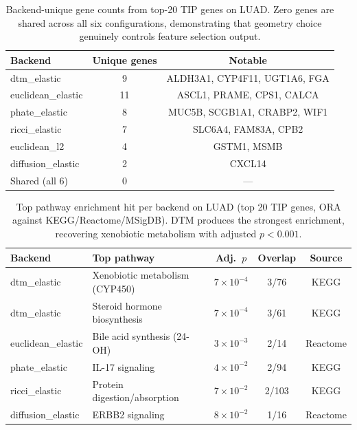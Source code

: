 \documentclass[11pt]{article}
\begin{document}
\begin{table}[h]
\centering
\small
\begin{tabular}{lcc}
\toprule
\textbf{Backend} & \textbf{Unique genes} & \textbf{Notable} \\
\midrule
dtm\_elastic & 9 & ALDH3A1, CYP4F11, UGT1A6, FGA \\
euclidean\_elastic & 11 & ASCL1, PRAME, CPS1, CALCA \\
phate\_elastic & 8 & MUC5B, SCGB1A1, CRABP2, WIF1 \\
ricci\_elastic & 7 & SLC6A4, FAM83A, CPB2 \\
euclidean\_l2 & 4 & GSTM1, MSMB \\
diffusion\_elastic & 2 & CXCL14 \\
\midrule
Shared (all 6) & 0 & --- \\
\bottomrule
\end{tabular}
\caption{Backend-unique gene counts from top-20 TIP genes on LUAD.
Zero genes are shared across all six configurations, demonstrating that geometry choice genuinely controls feature selection output.}
\label{tab:geneoverlap}
\end{table}

\begin{table}[h]
\centering
\small
\begin{tabular}{llccc}
\toprule
\textbf{Backend} & \textbf{Top pathway} & \textbf{Adj.\ $p$} & \textbf{Overlap} & \textbf{Source} \\
\midrule
dtm\_elastic & Xenobiotic metabolism (CYP450) & $7 \times 10^{-4}$ & 3/76 & KEGG \\
dtm\_elastic & Steroid hormone biosynthesis & $7 \times 10^{-4}$ & 3/61 & KEGG \\
euclidean\_elastic & Bile acid synthesis (24-OH) & $3 \times 10^{-3}$ & 2/14 & Reactome \\
phate\_elastic & IL-17 signaling & $4 \times 10^{-2}$ & 2/94 & KEGG \\
ricci\_elastic & Protein digestion/absorption & $7 \times 10^{-2}$ & 2/103 & KEGG \\
diffusion\_elastic & ERBB2 signaling & $8 \times 10^{-2}$ & 1/16 & Reactome \\
\bottomrule
\end{tabular}
\caption{Top pathway enrichment hit per backend on LUAD (top 20 TIP genes, ORA against KEGG/Reactome/MSigDB).
DTM produces the strongest enrichment, recovering xenobiotic metabolism with adjusted $p < 0.001$.}
\label{tab:enrichment}
\end{table}
\end{document}
